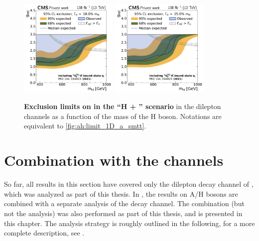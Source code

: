 \begin{figure}[!ph]
    \\
    \includegraphics[width=0.42\textwidth]{figures/ah/limits_etat_w2p8/H_limit_w18p0_g-scan.pdf}%
    \hspace*{0.05\textwidth}%
    \includegraphics[width=0.42\textwidth]{figures/ah/limits_etat_w2p8/H_limit_w25p0_g-scan.pdf}
    \caption{%
        \textbf{Exclusion limits on \gHtt in the ``H + \etat'' scenario} in the dilepton channels as a function of the mass of the H boson. Notations are equivalent to \cref{fig:ah:limit_1D_a_smtt}.
    }
    \label{fig:ah:limit_1D_h_etat}
\end{figure}

\section{Combination with the \texorpdfstring{\ljets}{l+jets} channels}
\label{sec:ah:combination}

So far, all results in this section have covered only the dilepton decay channel of \ttbar, which was analyzed as part of this thesis. In , the results on A/H bosons are combined with a separate analysis of the \ljets decay channel. The combination (but not the \ljets analysis) was also performed as part of this thesis, and is presented in this chapter. The \ljets analysis strategy is roughly outlined in the following, for a more complete description, see .


